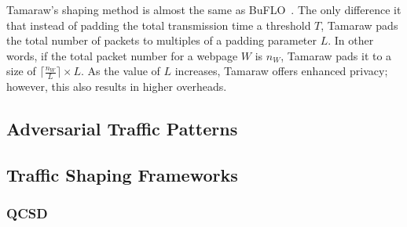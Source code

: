 Tamaraw's shaping method is almost the same as BuFLO~\cite{dyer2012peek}. The only difference it that instead of padding the total transmission time a threshold $T$, Tamaraw pads the total number of packets to multiples of a padding parameter $L$.
In other words, if the total packet number for a webpage $W$ is $n_W$, Tamaraw pads it to a size of $\lceil \frac{n_W}{L} \rceil \times L$.
As the value of $L$ increases, Tamaraw offers enhanced privacy; however, this also results in higher overheads.




\subsection{Adversarial Traffic Patterns}

\subsection{Traffic Shaping Frameworks}
\subsubsection{QCSD}


